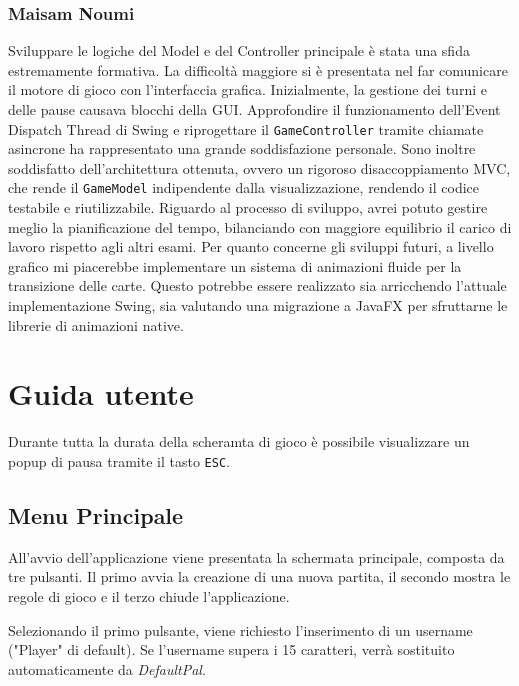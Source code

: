 \documentclass[a4paper,12pt]{report}
\begin{document}
\subsection{Maisam Noumi} 

Sviluppare le logiche del Model e del Controller principale è stata una sfida estremamente formativa. La difficoltà maggiore si è presentata nel far comunicare il motore di gioco con l'interfaccia grafica. Inizialmente, la gestione dei turni e delle pause causava blocchi della GUI. Approfondire il funzionamento dell'Event Dispatch Thread di Swing e riprogettare il \texttt{GameController} tramite chiamate asincrone ha rappresentato una grande soddisfazione personale. Sono inoltre soddisfatto dell'architettura ottenuta, ovvero un rigoroso disaccoppiamento MVC, che rende il \texttt{GameModel} indipendente dalla visualizzazione, rendendo il codice testabile e riutilizzabile.
Riguardo al processo di sviluppo, avrei potuto gestire meglio la pianificazione del tempo, bilanciando con maggiore equilibrio il carico di lavoro rispetto agli altri esami.
Per quanto concerne gli sviluppi futuri, a livello grafico mi piacerebbe implementare un sistema di animazioni fluide per la transizione delle carte. Questo potrebbe essere realizzato sia arricchendo l'attuale implementazione Swing, sia valutando una migrazione a JavaFX per sfruttarne le librerie di animazioni native.


\newpage
\appendix
\chapter{Guida utente}
Durante tutta la durata della scheramta di gioco è possibile visualizzare un popup di pausa tramite il tasto \texttt{ESC}.
\section{Menu Principale}
All'avvio dell'applicazione viene presentata la schermata principale, composta da tre pulsanti. Il primo avvia la creazione di una nuova partita, il secondo mostra le regole di gioco e il terzo chiude l'applicazione.

Selezionando il primo pulsante, viene richiesto l'inserimento di un username ("Player" di default). Se l'username supera i 15 caratteri, verrà sostituito automaticamente da 
\emph{DefaultPal}.
\end{document}
